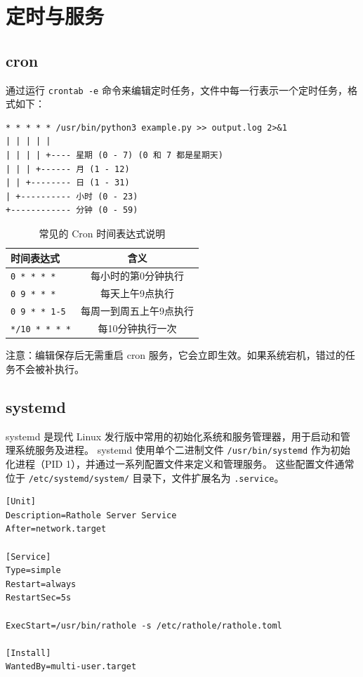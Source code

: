 \section{定时与服务}
\subsection{cron}
通过运行 \verb|crontab -e| 命令来编辑定时任务，文件中每一行表示一个定时任务，格式如下：

\begin{code}[title=cron 任务格式]
	\begin{verbatim}
* * * * * /usr/bin/python3 example.py >> output.log 2>&1
| | | | |
| | | | +---- 星期 (0 - 7) (0 和 7 都是星期天)
| | | +------ 月 (1 - 12)
| | +-------- 日 (1 - 31)
| +---------- 小时 (0 - 23)
+------------ 分钟 (0 - 59)
    \end{verbatim}
\end{code}

\begin{table}[h]
	\centering
	\begin{tabular}{|l|c|}
		\hline
		\textbf{时间表达式}        & \textbf{含义}  \\
		\hline
		\texttt{0 * * * *}    & 每小时的第0分钟执行   \\
		\texttt{0 9 * * *}    & 每天上午9点执行     \\
		\texttt{0 9 * * 1-5}  & 每周一到周五上午9点执行 \\
		\texttt{*/10 * * * *} & 每10分钟执行一次    \\
		\hline
	\end{tabular}
	\caption{常见的 Cron 时间表达式说明}
\end{table}

注意：编辑保存后无需重启 cron 服务，它会立即生效。如果系统宕机，错过的任务不会被补执行。

\subsection{systemd}
systemd 是现代 Linux 发行版中常用的初始化系统和服务管理器，用于启动和管理系统服务及进程。
systemd 使用单个二进制文件 \verb|/usr/bin/systemd| 作为初始化进程（PID 1），并通过一系列配置文件来定义和管理服务。
这些配置文件通常位于 \verb|/etc/systemd/system/| 目录下，文件扩展名为 \verb|.service|。

\begin{code}[title=/etc/systemd/system/rathole.service]
	\begin{verbatim}
[Unit]
Description=Rathole Server Service
After=network.target

[Service]
Type=simple
Restart=always
RestartSec=5s

ExecStart=/usr/bin/rathole -s /etc/rathole/rathole.toml

[Install]
WantedBy=multi-user.target
    \end{verbatim}
\end{code}

